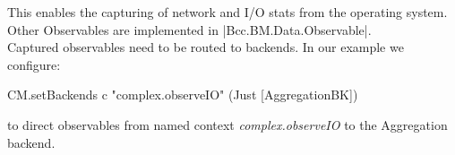 This enables the capturing of network and I/O stats from the operating system.
Other Observables are implemented in |Bcc.BM.Data.Observable|.
\\
Captured observables need to be routed to backends. In our example we configure:
\begin{spec}
    CM.setBackends c "complex.observeIO" (Just [AggregationBK])
\end{spec}
to direct observables from named context \emph{complex.observeIO} to the
Aggregation backend.
